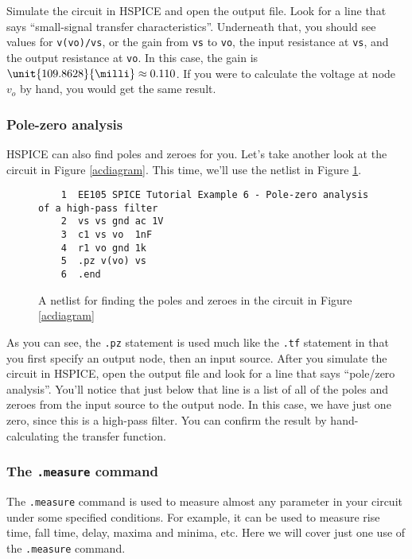 \documentclass{article}
\begin{document}
Simulate the circuit in HSPICE and open the output file. Look for a line that says ``small-signal transfer characteristics''. Underneath that, you should see values for \verb|v(vo)/vs|, or the gain from \verb|vs| to \verb|vo|, the input resistance at \verb|vs|, and the output resistance at \verb|vo|. In this case, the gain is $\unit{109.8628}{\milli} \approx 0.110$. If you were to calculate the voltage at node $v_o$ by hand, you would get the same result.

\subsubsection{Pole-zero analysis}

HSPICE can also find poles and zeroes for you. Let's take another look at the circuit in Figure \ref{acdiagram}. This time, we'll use the netlist in Figure \ref{pznetlist}.

\begin{figure}[!htb]
  \begin{verbatim}
    1  EE105 SPICE Tutorial Example 6 - Pole-zero analysis of a high-pass filter
    2  vs vs gnd ac 1V
    3  c1 vs vo  1nF
    4  r1 vo gnd 1k
    5  .pz v(vo) vs
    6  .end \end{verbatim}
  \caption{A netlist for finding the poles and zeroes in the circuit in Figure \ref{acdiagram}}
  \label{pznetlist}
\end{figure}

As you can see, the \verb|.pz| statement is used much like the \verb|.tf| statement in that you first specify an output node, then an input source. After you simulate the circuit in HSPICE, open the output file and look for a line that says ``pole/zero analysis''. You'll notice that just below that line is a list of all of the poles and zeroes from the input source to the output node. In this case, we have just one zero, since this is a high-pass filter. You can confirm the result by hand-calculating the transfer function.

\subsubsection{The \texttt{.measure} command}

The \verb|.measure| command is used to measure almost any parameter in your circuit under some specified conditions. For example, it can be used to measure rise time, fall time, delay, maxima and minima, etc. Here we will cover just one use of the \verb|.measure| command.
\end{document}
